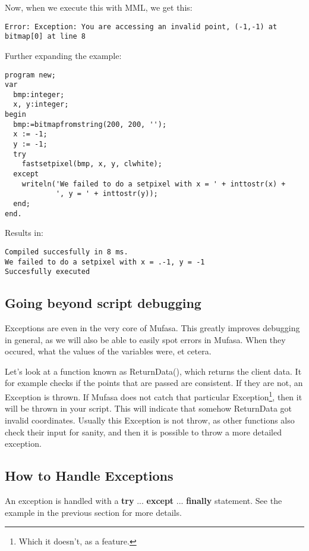 \documentclass[a4paper]{report}
\begin{document}
Now, when we execute this with MML, we get this:

\begin{verbatim}
Error: Exception: You are accessing an invalid point, (-1,-1) at bitmap[0] at line 8
\end{verbatim}

Further expanding the example:
\begin{verbatim}
program new;
var
  bmp:integer;
  x, y:integer;
begin
  bmp:=bitmapfromstring(200, 200, '');
  x := -1;
  y := -1;
  try
  	fastsetpixel(bmp, x, y, clwhite);
  except
  	writeln('We failed to do a setpixel with x = ' + inttostr(x) + 
			', y = ' + inttostr(y));
  end;
end.

\end{verbatim}

Results in:

\begin{verbatim}
Compiled succesfully in 8 ms.
We failed to do a setpixel with x = .-1, y = -1
Succesfully executed
\end{verbatim}

\subsection{Going beyond script debugging}
Exceptions are even in the very core of Mufasa. This greatly improves
debugging in general, as we will also be able to easily spot errors in Mufasa.
When they occured, what the values of the variables were, et cetera.

Let's look at a function known as ReturnData(), which returns the client data.
It for example checks if the points that are passed are consistent.
If they are not, an Exception is thrown. If Mufasa does not catch that 
particular Exception\footnote{Which it doesn't, as a feature.}, then it will
be thrown in your script. This will indicate that somehow ReturnData got
invalid coordinates. Usually this Exception is not throw, as other functions
also check their input for sanity, and then it is possible to throw a more
detailed exception.

\subsection{How to Handle Exceptions}

An exception is handled with a \textbf{try} ... \textbf{except}
... \textbf{finally} statement.
See the example in the previous section for more details.
\end{document}
